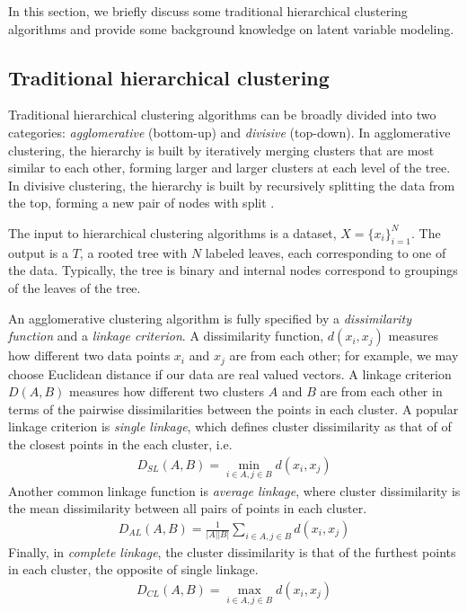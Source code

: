 \documentclass{article}
\begin{document}
In this section, we briefly discuss
some traditional hierarchical clustering algorithms
and provide some
background knowledge on latent variable modeling.

\subsection{Traditional hierarchical clustering}
Traditional hierarchical clustering algorithms
can be broadly divided into two categories:
\emph{agglomerative} (bottom-up) and \emph{divisive} (top-down).
In agglomerative clustering, the hierarchy
is built by iteratively merging clusters
that are most similar to each other, forming
larger and larger clusters at each level
of the tree.
In divisive clustering,
the hierarchy is built by recursively
splitting the data from the top,
forming a new pair of nodes with 
split \cite{Hastie2009}.

The input to hierarchical clustering algorithms
is a dataset, $X = \{x_i\}_{i = 1}^N$.
The output is a $T$,
a rooted tree with $N$
labeled leaves,
each corresponding to one of the data.
Typically, the tree is binary
and internal nodes correspond
to groupings of the leaves
of the tree.

An agglomerative clustering algorithm is fully specified
by a \emph{dissimilarity function} and a \emph{linkage criterion}.
A dissimilarity function,
$d(x_i, x_j)$ measures
how different two data points $x_i$ and $x_j$ are from each other;
for example, we may choose Euclidean distance 
if our data are real valued vectors.
A linkage criterion $D(A, B)$ measures how different two clusters
$A$ and $B$
are from each other in terms of the pairwise
dissimilarities between the points in each cluster.
A popular linkage criterion is
\emph{single linkage}, which defines
cluster dissimilarity
as that of
of the closest points in 
the each cluster,
i.e.
\begin{align}
  D_{SL}(A, B) = \min_{i\in A, j \in B} d(x_i, x_j)
\end{align}
Another common linkage function is \emph{average linkage}, 
where cluster dissimilarity is
the mean dissimilarity between
all pairs of points in each cluster.
\begin{align}
  D_{AL}(A, B) = \frac{1}{|A||B|}\sum_{i\in A, j \in B} d(x_i, x_j)
\end{align}
Finally, in \emph{complete linkage}, the cluster
dissimilarity
is that of the furthest points in each cluster,
the opposite of single linkage.
\begin{align}
  D_{CL}(A, B) = \max_{i\in A, j \in B} d(x_i, x_j)
\end{align}
\end{document}

